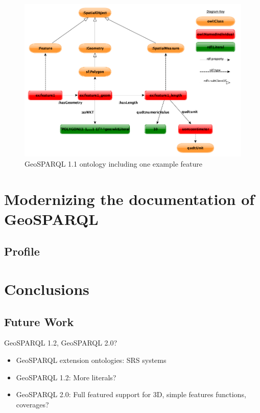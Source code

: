 \documentclass[runningheads]{llncs}
\begin{document}
\begin{figure}[htb]
    \centering
    \includegraphics[width=\linewidth]{images/geold_ontology.png}
    \caption{GeoSPARQL 1.1 ontology including one example feature}
    \label{fig:geosparql11ontology}
\end{figure}


\section{Modernizing the documentation of GeoSPARQL}\label{sec:documentation}


\subsection{Profile}\label{sec:profile}


\section{Conclusions}\label{sec:conclusions}

\subsection{Future Work}\label{sec:futurework}
GeoSPARQL 1.2, GeoSPARQL 2.0?
\begin{itemize}
    \item GeoSPARQL extension ontologies: SRS systems
    \item GeoSPARQL 1.2: More literals?
    \item GeoSPARQL 2.0: Full featured support for 3D, simple features functions, coverages?
\end{itemize}
\end{document}
